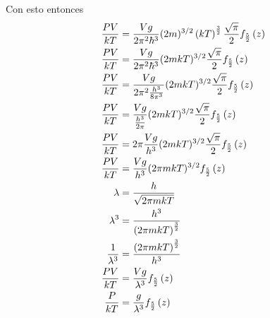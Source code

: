 \documentclass{report}
\begin{document}
\begin{enumerate}
    Con esto entonces
    \begin{align*}
      \frac{PV}{kT}&=\frac{V g }{2\pi^2 \hbar^3} (2m)^{3/2} \left(kT\right)^{\frac{3}{2}}\frac{\sqrt{\pi}}{2}f_{\frac{5}{2}}\left(z\right)\\
      \frac{PV}{kT}&=\frac{V g }{2\pi^2 \hbar^3} (2mkT)^{3/2} \frac{\sqrt{\pi}}{2}f_{\frac{5}{2}}\left(z\right)\\
      \frac{PV}{kT}&=\frac{V g }{2\pi^2 \frac{h^3}{8\pi^3}} (2mkT)^{3/2} \frac{\sqrt{\pi}}{2}f_{\frac{5}{2}}\left(z\right)\\
      \frac{PV}{kT}&=\frac{V g }{\frac{h^3}{2\pi}} (2mkT)^{3/2} \frac{\sqrt{\pi}}{2}f_{\frac{5}{2}}\left(z\right)\\
      \frac{PV}{kT}&=2\pi\frac{V g }{h^3} (2mkT)^{3/2} \frac{\sqrt{\pi}}{2}f_{\frac{5}{2}}\left(z\right)\\
      \frac{PV}{kT}&=\frac{V g }{h^3} (2\pi mkT)^{3/2} f_{\frac{5}{2}}\left(z\right)\\
      \lambda &= \frac{h}{\sqrt{2\pi mkT}}\\
      \lambda^3 &= \frac{h^3}{\left(2\pi mkT\right)^{\frac{3}{2}}}\\
      \frac{1}{\lambda^3} &= \frac{\left(2\pi mkT\right)^{\frac{3}{2}}}{h^3}\\
      \frac{PV}{kT}&=\frac{V g }{\lambda^3} f_{\frac{5}{2}}\left(z\right)\\
      \frac{P}{kT}&=\frac{g }{\lambda^3} f_{\frac{5}{2}}\left(z\right)\\
    \end{align*}
    

\end{enumerate}
\end{document}
